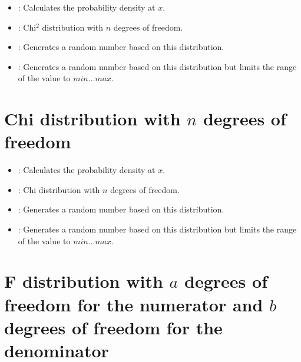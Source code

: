 \begin{itemize}

\item
{}:
Calculates the probability density at $x$.

\item
{}:
Chi$^2$ distribution with $n$ degrees of freedom.

\item
{}:
Generates a random number based on this distribution.

\item
{}:
Generates a random number based on this distribution but limits the range of the value to $min\ldots max$.

\end{itemize}



\section{Chi distribution with \texorpdfstring{$n$}{n} degrees of freedom}

\begin{itemize}

\item
{}:
Calculates the probability density at $x$.

\item
{}:
Chi distribution with $n$ degrees of freedom.

\item
{}:
Generates a random number based on this distribution.

\item
{}:
Generates a random number based on this distribution but limits the range of the value to $min\ldots max$.

\end{itemize}



\section{F distribution with \texorpdfstring{$a$}{a} degrees of freedom for the numerator and \texorpdfstring{$b$}{b} degrees of freedom for the denominator}

